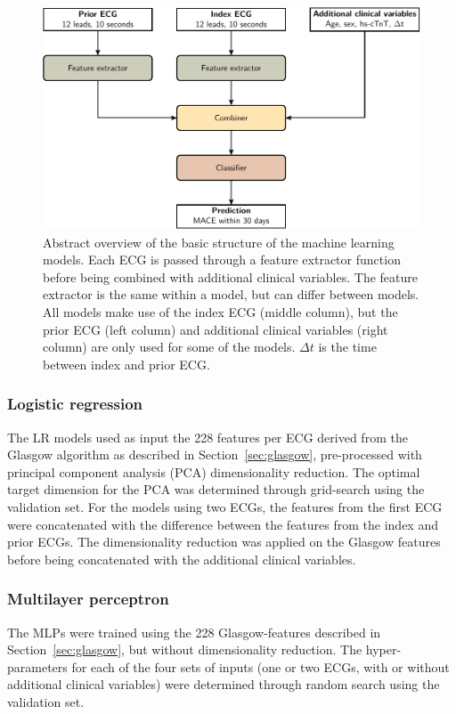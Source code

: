 \documentclass[preprint]{elsarticle}
\begin{document}
\begin{figure}[h!]
\includegraphics[width=\linewidth]{figures/overview.pdf}
\centering
\caption{Abstract overview of the basic structure of the machine learning models. Each ECG is passed through a feature extractor function before being combined with additional clinical variables. The feature extractor is the same within a model, but can differ between models. All models make use of the index ECG (middle column), but the prior ECG (left column) and additional clinical variables (right column) are only used for some of the models. $\Delta t$ is the time between index and prior ECG.}
\label{fig:model:overview}
\end{figure}

\subsubsection{Logistic regression}
The LR models used as input the 228 features per ECG derived from the Glasgow algorithm as described in Section~\ref{sec:glasgow}, pre-processed with principal component analysis (PCA) dimensionality reduction. The optimal target dimension for the PCA was determined through grid-search using the validation set. For the models using two ECGs, the features from the first ECG were concatenated with the difference between the features from the index and prior ECGs. The dimensionality reduction was applied on the Glasgow features before being concatenated with the additional clinical variables.

\subsubsection{Multilayer perceptron}
The MLPs were trained using the 228 Glasgow-features described in Section~\ref{sec:glasgow}, but without dimensionality reduction. The hyper-parameters for each of the four sets of inputs (one or two ECGs, with or without additional clinical variables) were determined through random search using the validation set.
\end{document}

